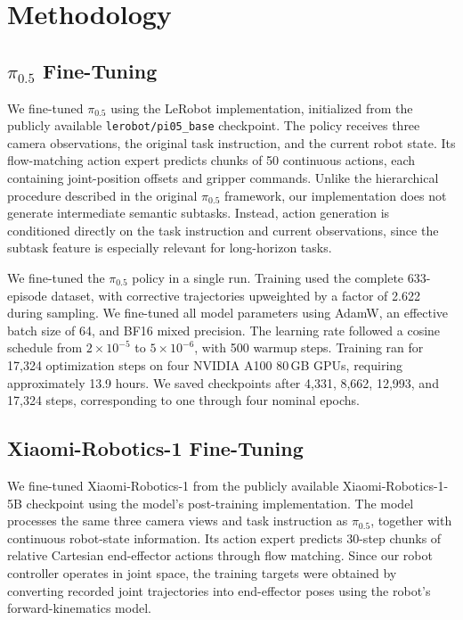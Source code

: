 \documentclass[10pt,twocolumn,letterpaper]{article}
\begin{document}
\section{Methodology}

\subsection{$\pi_{0.5}$ Fine-Tuning}

We fine-tuned $\pi_{0.5}$ using the LeRobot implementation, initialized from the publicly available \texttt{lerobot/pi05\_base} checkpoint. The policy receives three camera observations, the original task instruction, and the current robot state. Its flow-matching action expert predicts chunks of 50 continuous actions, each containing joint-position offsets and gripper commands. Unlike the hierarchical procedure described in the original $\pi_{0.5}$ framework, our implementation does not generate intermediate semantic subtasks. Instead, action generation is conditioned directly on the task instruction and current observations, since the subtask feature is especially relevant for long-horizon tasks. 

We fine-tuned the $\pi_{0.5}$ policy in a single run. Training used the complete 633-episode dataset, with corrective trajectories upweighted by a factor of 2.622 during sampling. We fine-tuned all model parameters using AdamW, an effective batch size of 64, and BF16 mixed precision. The learning rate followed a cosine schedule from $2\times10^{-5}$ to $5\times10^{-6}$, with 500 warmup steps. Training ran for 17,324 optimization steps on four NVIDIA A100 80\,GB GPUs, requiring approximately 13.9 hours. We saved checkpoints after 4,331, 8,662, 12,993, and 17,324 steps, corresponding to one through four nominal epochs.

\subsection{Xiaomi-Robotics-1 Fine-Tuning}

We fine-tuned Xiaomi-Robotics-1 from the publicly available Xiaomi-Robotics-1-5B checkpoint using the model's post-training implementation. The model processes the same three camera views and task instruction as $\pi_{0.5}$, together with continuous robot-state information. Its action expert predicts 30-step chunks of relative Cartesian end-effector actions through flow matching. Since our robot controller operates in joint space, the training targets were obtained by converting recorded joint trajectories into end-effector poses using the robot's forward-kinematics model.
\end{document}
